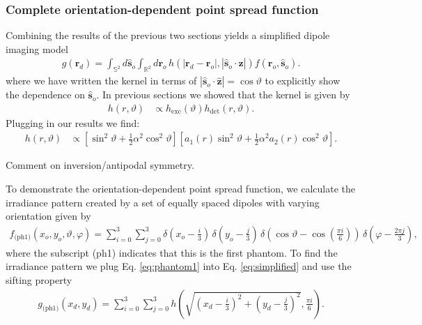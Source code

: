 \documentclass[]{osa-article}
\providecommand{\ro}{\mathbf{\mathbf{r}}_o}
\providecommand{\so}{\mathbf{\hat{s}}_o}
\providecommand{\rd}{\mathbf{r}_d}
\providecommand{\mh}[1]{\mathbf{\hat{#1}}}
\providecommand{\mbb}[1]{\mathbb{#1}}
\begin{document}
\subsubsection{Complete orientation-dependent point spread function}
 Combining the results of the previous two sections yields a simplified dipole
 imaging model 
 \begin{align}
g(\rd{}) = \int_{\mbb{S}^2}d\so{}\int_{\mbb{R}^2}d\ro{}\, h(|\rd - \ro|, |\so\cdot \mh{z}|)f(\ro, \so).\label{eq:simplified}
 \end{align}
 where we have written the kernel in terms of $|\so\cdot\mh{z}| = \cos\vartheta$
 to explicitly show the dependence on $\so$. In previous sections we showed that the
 kernel is given by 
 \begin{align}
   h(r, \vartheta) &\propto h_{\text{exc}}(\vartheta)h_{\text{det}}(r,\vartheta).
 \end{align}
 Plugging in our results we find:
 \begin{align}
   h(r, \vartheta) &\propto \left[\sin^2\vartheta + \frac{1}{2}\alpha^2 \cos^2\vartheta\right]\left[a_1(r)\sin^2\vartheta + \frac{1}{2}\alpha^2 a_2(r)\cos^2\vartheta\right]. \label{eq:sa-psf}
 \end{align}

 Comment on inversion/antipodal symmetry. 

 To demonstrate the orientation-dependent point spread function, we calculate
 the irradiance pattern created by a set of equally spaced dipoles with varying
 orientation given by
 \begin{align}
   f_{\text{(ph1)}}(x_o, y_o, \vartheta, \varphi) = \sum_{i=0}^3 \sum_{j=0}^3 \delta\left(x_o - \frac{i}{3}\right)\, \delta\left(y_o - \frac{j}{3}\right)\, \delta\left(\cos\vartheta - \cos\left(\frac{\pi i}{6}\right)\right)\, \delta\left(\varphi - \frac{2\pi j}{3}\right),\label{eq:phantom1}
 \end{align}
 where the subscript (ph1) indicates that this is the first phantom. To find the
 irradiance pattern we plug Eq. \ref{eq:phantom1} into Eq. \ref{eq:simplified}
 and use the sifting property
 \begin{align}
   g_{\text{(ph1)}}(x_d, y_d) = \sum_{i=0}^3 \sum_{j=0}^3 h\left(\sqrt{\left(x_d - \frac{i}{3}\right)^2 + \left(y_d - \frac{j}{3}\right)^2}, \frac{\pi i}{6}\right).\label{eq:phantom1irr}
 \end{align}
 
\end{document}
